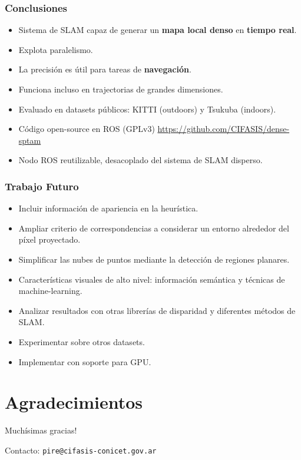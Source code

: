\documentclass[compress]{beamer}
\begin{document}
\begin{frame}
	\frametitle{Conclusiones}
	\begin{itemize}
		\item Sistema de SLAM capaz de generar un \textbf{mapa local denso} en \textbf{tiempo real}.
	    \item Explota paralelismo.
        \item La precisión es útil para tareas de \textbf{navegación}.
        \item Funciona incluso en trajectorias de grandes dimensiones.
        \item Evaluado en datasets públicos: KITTI (outdoors) y Tsukuba (indoors).
	    \item Código open-source en ROS (GPLv3) \url{https://github.com/CIFASIS/dense-sptam}
	    \item Nodo ROS reutilizable, desacoplado del sistema de SLAM disperso.
	\end{itemize}
\end{frame}


\begin{frame}
	\frametitle{Trabajo Futuro}
	\begin{itemize}
		\item Incluir información de apariencia en la heurística.
		\item Ampliar criterio de correspondencias a considerar un entorno alrededor del píxel proyectado.
		\item Simplificar las nubes de puntos mediante la detección de regiones planares.
		\item Características visuales de alto nivel: información semántica y técnicas de machine-learning.
		\item Analizar resultados con otras librerías de disparidad y diferentes métodos de SLAM.
		\item Experimentar sobre otros datasets.
		\item Implementar con soporte para GPU.
	\end{itemize}
\end{frame}


\section*{Agradecimientos}

\begin{frame}
	\centering
	\Large{Muchísimas gracias!}
	
	
	\vspace{2cm}
	Contacto: {\tt pire@cifasis-conicet.gov.ar}
\end{frame}
\end{document}

